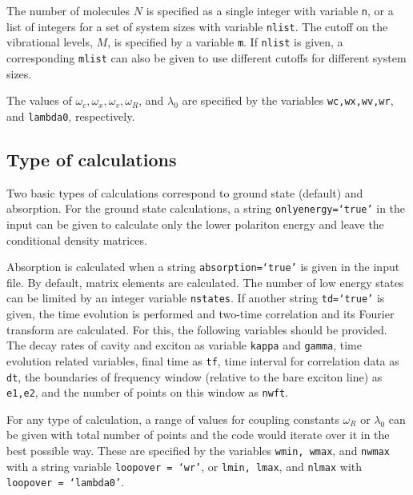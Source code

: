 \documentclass[final,twocolumn]{elsarticle}
\begin{document}
\begin{small}

The number of molecules $N$ is specified 
as a single integer with variable \texttt{n},
 or a list of integers for a set of system sizes
 with variable \texttt{nlist}.
The cutoff on the vibrational levels, $M$,
is specified by a variable
\texttt{m}.
If \texttt{nlist} is given,
a corresponding \texttt{mlist} can also be given
 to use different cutoffs for different system sizes.

The values of $\omega_c,\omega_x,\omega_v,\omega_R$, and $\lambda_0$
are specified by the variables
\texttt{wc,wx,wv,wr}, and \texttt{lambda0}, respectively.


\subsection{Type of calculations}
Two basic types of calculations correspond to
ground state (default) and absorption.
For the ground state calculations, 
a string \texttt{onlyenergy=`true'} in the input can be given 
to calculate only the lower polariton energy and
leave the conditional density matrices.

Absorption is calculated when 
a string \texttt{absorption=`true'} is given in the input file.
By default, matrix elements are calculated. 
The number of low energy states can be limited by an integer variable 
\texttt{nstates}.
If another string \texttt{td=`true'} is given, the time evolution
is performed and two-time correlation and its Fourier transform
are calculated. 
For this, the following variables should be provided.
The decay rates of
cavity and exciton 
as variable \texttt{kappa} and \texttt{gamma},
time evolution related variables,
final time as \texttt{tf}, 
time interval for correlation data as \texttt{dt},
the boundaries of frequency window (relative to the bare exciton line)
as \texttt{e1,e2}, and the number of points on this window as \texttt{nwft}.

For any type of calculation, 
a range of values for coupling constants 
$\omega_R$ or $\lambda_0$
can be given with total number of points 
and the code would iterate over it in the best possible way.
These are specified by the variables
\texttt{wmin, wmax}, and \texttt{nwmax} with a string variable 
\texttt{loopover =  `wr'}, or \texttt{lmin, lmax}, and \texttt{nlmax} 
with \texttt{loopover = `lambda0'}.


\end{small}
\end{document}
